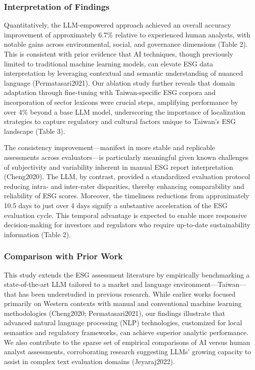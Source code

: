 \documentclass[
  12pt,
]{article}
\begin{document}
\subsubsection{Interpretation of
Findings}\label{interpretation-of-findings}

Quantitatively, the LLM-empowered approach achieved an overall accuracy
improvement of approximately 6.7\% relative to experienced human
analysts, with notable gains across environmental, social, and
governance dimensions (Table 2). This is consistent with prior evidence
that AI techniques, though previously limited to traditional machine
learning models, can elevate ESG data interpretation by leveraging
contextual and semantic understanding of nuanced language
(Permatasari2021). Our ablation study further reveals that domain
adaptation through fine-tuning with Taiwan-specific ESG corpora and
incorporation of sector lexicons were crucial steps, amplifying
performance by over 4\% beyond a base LLM model, underscoring the
importance of localization strategies to capture regulatory and cultural
factors unique to Taiwan's ESG landscape (Table 3).

The consistency improvement---manifest in more stable and replicable
assessments across evaluators---is particularly meaningful given known
challenges of subjectivity and variability inherent in manual ESG report
interpretation (Cheng2020). The LLM, by contrast, provided a
standardized evaluation protocol reducing intra- and inter-rater
disparities, thereby enhancing comparability and reliability of ESG
scores. Moreover, the timeliness reductions from approximately 10.5 days
to just over 4 days signify a substantive acceleration of the ESG
evaluation cycle. This temporal advantage is expected to enable more
responsive decision-making for investors and regulators who require
up-to-date sustainability information (Table 2).

\subsubsection{Comparison with Prior
Work}\label{comparison-with-prior-work}

This study extends the ESG assessment literature by empirically
benchmarking a state-of-the-art LLM tailored to a market and language
environment---Taiwan---that has been understudied in previous research.
While earlier works focused primarily on Western contexts with manual
and conventional machine learning methodologies (Cheng2020;
Permatasari2021), our findings illustrate that advanced natural language
processing (NLP) technologies, customized for local semantics and
regulatory frameworks, can achieve superior analytic performance. We
also contribute to the sparse set of empirical comparisons of AI versus
human analyst assessments, corroborating research suggesting LLMs'
growing capacity to assist in complex text evaluation domains
(Jeyaraj2022).
\end{document}
